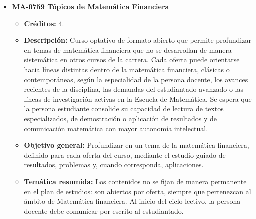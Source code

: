 \begin{itemize}[leftmargin=1.3em, itemsep=10pt, topsep=4pt, label={\color{Azul-UCR}$\blacksquare$}]
\item {\color{Azul-UCR}\textbf{MA-0759 Tópicos de Matemática Financiera}}\par\nopagebreak\smallskip
\begin{itemize}[leftmargin=1.1em, itemsep=3pt, topsep=2pt, parsep=2pt, label={\textendash}]
\item \textbf{Créditos:} 4.
\item \textbf{Descripción:} Curso optativo de formato abierto que permite profundizar en temas de matemática financiera que no se desarrollan de manera sistemática en otros cursos de la carrera. Cada oferta puede orientarse hacia líneas distintas dentro de la matemática financiera, clásicas o contemporáneas, según la especialidad de la persona docente, los avances recientes de la disciplina, las demandas del estudiantado avanzado o las líneas de investigación activas en la Escuela de Matemática. Se espera que la persona estudiante consolide su capacidad de lectura de textos especializados, de demostración o aplicación de resultados y de comunicación matemática con mayor autonomía intelectual.
\item \textbf{Objetivo general:} Profundizar en un tema de la matemática financiera, definido para cada oferta del curso, mediante el estudio guiado de resultados, problemas y, cuando corresponda, aplicaciones.
\item \textbf{Temática resumida:} Los contenidos no se fijan de manera permanente en el plan de estudios: son abiertos por oferta, siempre que pertenezcan al ámbito de Matemática financiera. Al inicio del ciclo lectivo, la persona docente debe comunicar por escrito al estudiantado.
\end{itemize}


\end{itemize}

